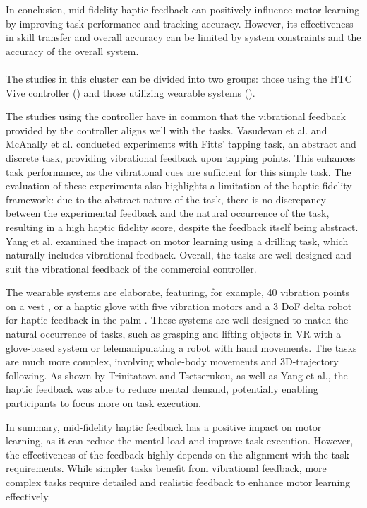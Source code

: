 In conclusion, mid-fidelity haptic feedback can positively influence motor learning by improving task performance and tracking accuracy. However, its effectiveness in skill transfer and overall accuracy can be limited by system constraints and the accuracy of the overall system.


\paragraph{}
The studies in this cluster can be divided into two groups: those using the HTC Vive controller (\cite{Vasudevan2020, Yang2023, McAnally2023}) and those utilizing wearable systems (\cite{LiuH2019, Trinitatova2023, Xia2023}).

The studies using the controller have in common that the vibrational feedback provided by the controller aligns well with the tasks. Vasudevan et al. and McAnally et al. conducted experiments with Fitts' tapping task, an abstract and discrete task, providing vibrational feedback upon tapping points. This enhances task performance, as the vibrational cues are sufficient for this simple task. The evaluation of these experiments also highlights a limitation of the haptic fidelity framework: due to the abstract nature of the task, there is no discrepancy between the experimental feedback and the natural occurrence of the task, resulting in a high haptic fidelity score, despite the feedback itself being abstract. Yang et al. examined the impact on motor learning using a drilling task, which naturally includes vibrational feedback. Overall, the tasks are well-designed and suit the vibrational feedback of the commercial controller.

The wearable systems are elaborate, featuring, for example, 40 vibration points on a vest \cite{Xia2023}, or a haptic glove with five vibration motors and a 3 DoF delta robot for haptic feedback in the palm \cite{Trinitatova2023}. These systems are well-designed to match the natural occurrence of tasks, such as grasping and lifting objects in VR with a glove-based system or telemanipulating a robot with hand movements. The tasks are much more complex, involving whole-body movements and 3D-trajectory following. As shown by Trinitatova and Tsetserukou, as well as Yang et al., the haptic feedback was able to reduce mental demand, potentially enabling participants to focus more on task execution.

In summary, mid-fidelity haptic feedback has a positive impact on motor learning, as it can reduce the mental load and improve task execution. However, the effectiveness of the feedback highly depends on the alignment with the task requirements. While simpler tasks benefit from vibrational feedback, more complex tasks require detailed and realistic feedback to enhance motor learning effectively.

